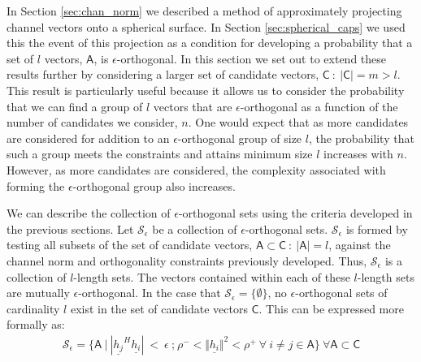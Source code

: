 In Section \ref{sec:chan_norm} we described a method of approximately projecting channel vectors onto a spherical surface. In Section \ref{sec:spherical_caps} we used this the event of this projection as a condition for developing a probability that a set of $l$ vectors, $\mathsf{A}$, is $\epsilon$-orthogonal. In this section we set out to extend these results further by considering a larger set of candidate vectors, $\mathsf{C} \ :\ \vert \mathsf{C} \vert = m >l$. This result is particularly useful because it allows us to consider the probability that we can find a group of $l$ vectors that are $\epsilon$-orthogonal as a function of the number of candidates we consider, $n$. One would expect that as more candidates are considered for addition to an $\epsilon$-orthogonal group of size $l$, the probability that such a group meets the constraints and attains minimum size $l$ increases with $n$. However, as more candidates are considered, the complexity associated with forming the $\epsilon$-orthogonal group also increases. 

We can describe the collection of $\epsilon$-orthogonal sets using the criteria developed in the previous sections. Let $\mathscr{S}_\epsilon$ be a collection of $\epsilon$-orthogonal sets. $\mathscr{S}_\epsilon$ is formed by testing all subsets of the set of candidate vectors, $\mathsf{A}\subset\mathsf{C}\ : \ \vert \mathsf{A} \vert = l$, against the channel norm and orthogonality constraints previously developed. Thus, $\mathscr{S}_\epsilon$ is a collection of $l$-length sets. The vectors contained within each of these $l$-length sets are mutually $\epsilon$-orthogonal. In the case that $\mathscr{S}_\epsilon = \lbrace \emptyset \rbrace$, no $\epsilon$-orthogonal sets of cardinality $l$ exist in the set of candidate vectors $\mathsf{C}$. This can be expressed more formally as:
 \begin{equation}\label{eq:S_e}
    \begin{aligned}
        \mathscr{S}_\epsilon = \lbrace \mathsf{A}\ \big|\ | \underline{h_j}^H\underline{h_i} |\ <\ \epsilon \ \text{;} \ \rho^-<\Vert \underline{h_i} \Vert^2 < \rho^+\ \forall \ i \neq j \in \mathsf{A} \rbrace \ \forall \mathsf{A}\subset \mathsf{C}
    \end{aligned}
\end{equation}

